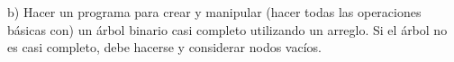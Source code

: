 {\color[rgb]{1,0,0}
b) Hacer un programa para crear y manipular (hacer todas
las operaciones básicas con) un árbol binario casi completo
utilizando un arreglo. Si el árbol no es casi completo, debe
hacerse y considerar nodos vacíos.
}